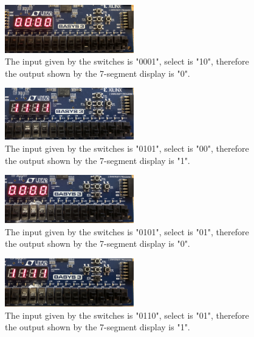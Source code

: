 \documentclass[11pt]{article}
\begin{document}
\begin{figure}[H]
\begin{center}
	\includegraphics[width=0.5\textwidth]{../report-images/Part2/IMG_3100.jpg}
	\caption{\label{fig:p2img6}The input given by the switches is "0001", select is "10", therefore the output shown by the 7-segment display is "0".}
\end{center}
\end{figure}

\begin{figure}[H]
\begin{center}
	\includegraphics[width=0.5\textwidth]{../report-images/Part2/IMG_3101.jpg}
	\caption{\label{fig:p2img7}The input given by the switches is "0101", select is "00", therefore the output shown by the 7-segment display is "1".}
\end{center}
\end{figure}

\begin{figure}[H]
\begin{center}
	\includegraphics[width=0.5\textwidth]{../report-images/Part2/IMG_3102.jpg}
	\caption{\label{fig:p2img8}The input given by the switches is "0101", select is "01", therefore the output shown by the 7-segment display is "0".}
\end{center}
\end{figure}

\begin{figure}[H]
\begin{center}
	\includegraphics[width=0.5\textwidth]{../report-images/Part2/IMG_3105.jpg}
	\caption{\label{fig:p2img9}The input given by the switches is "0110", select is "01", therefore the output shown by the 7-segment display is "1".}
\end{center}
\end{figure}
\end{document}

